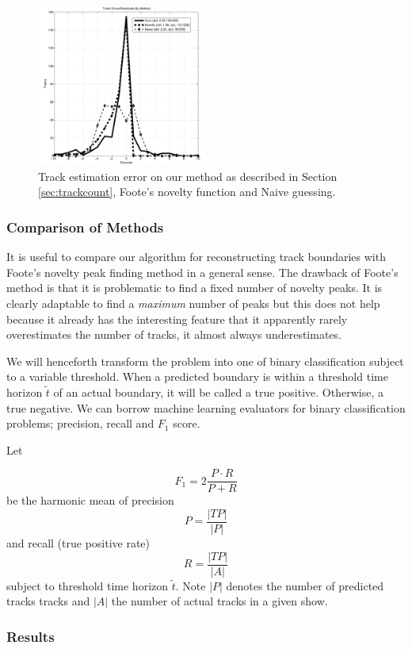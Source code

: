 \documentclass[twocolumn]{article}
\begin{document}
\begin{figure}
	\centering
	\includegraphics[width=0.5\textwidth]{images/trackshift}
	\caption{Track estimation error on our method as described in Section \ref{sec:trackcount}, Foote's novelty function and Naive guessing. }
	\label{fig:track_shift}
\end{figure}

\subsubsection{Comparison of Methods}

It is useful to compare our algorithm for reconstructing track boundaries with Foote's novelty peak finding method in a general sense. The drawback of Foote's method is that it is problematic to find a fixed number of novelty peaks. It is clearly adaptable to find a \textit{maximum} number of peaks but this does not help because it already has the interesting feature that it apparently rarely overestimates the number of tracks, it almost always underestimates.

We will henceforth transform the problem into one of binary classification subject to a variable threshold. When a predicted boundary is within a threshold time horizon $\tilde t$ of an actual boundary, it will be called a true positive. Otherwise, a true negative. We can borrow machine learning evaluators for binary classification problems; precision, recall and $F_1$ score.

Let

\[
F_1 = 2\frac{P \cdot R}{P+R}
\] be the harmonic mean of precision 
\[
P = \frac{|TP|}{|P|}
\]
 and recall (true positive rate)
\[
R=\frac{|TP|}{|A|}
\] subject to threshold time horizon $\tilde t$. Note $|P|$ denotes the number of predicted tracks tracks and $|A|$ the number of actual tracks in a given show.

\subsubsection{Results}
\end{document}
